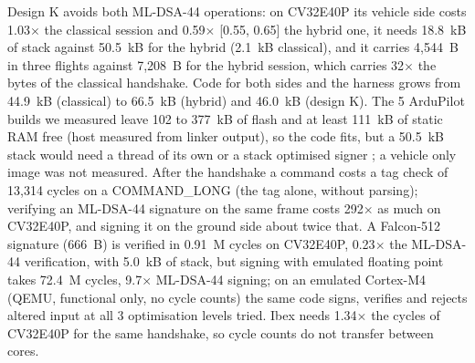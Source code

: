 \documentclass[conference]{IEEEtran}
\begin{document}
Design K avoids both ML-DSA-44 operations: on CV32E40P its vehicle side costs 1.03$\times$ the classical session and 0.59$\times$ [0.55, 0.65] the hybrid one, it needs 18.8~kB of stack against 50.5~kB for the hybrid (2.1~kB classical), and it carries 4,544~B in three flights against 7,208~B for the hybrid session, which carries 32$\times$ the bytes of the classical handshake. Code for both sides and the harness grows from 44.9~kB (classical) to 66.5~kB (hybrid) and 46.0~kB (design K). The 5 ArduPilot builds we measured leave 102 to 377~kB of flash and at least 111~kB of static RAM free (host measured from linker output), so the code fits, but a 50.5~kB stack would need a thread of its own or a stack optimised signer \cite{greconici21}; a vehicle only image was not measured. After the handshake a command costs a tag check of 13,314 cycles on a COMMAND\_LONG (the tag alone, without parsing); verifying an ML-DSA-44 signature on the same frame costs 292$\times$ as much on CV32E40P, and signing it on the ground side about twice that. A Falcon-512 signature (666~B) is verified in 0.91~M cycles on CV32E40P, 0.23$\times$ the ML-DSA-44 verification, with 5.0~kB of stack, but signing with emulated floating point takes 72.4~M cycles, 9.7$\times$ ML-DSA-44 signing; on an emulated Cortex-M4 (QEMU, functional only, no cycle counts) the same code signs, verifies and rejects altered input at all 3 optimisation levels tried. Ibex needs 1.34$\times$ the cycles of CV32E40P for the same handshake, so cycle counts do not transfer between cores.
\end{document}
